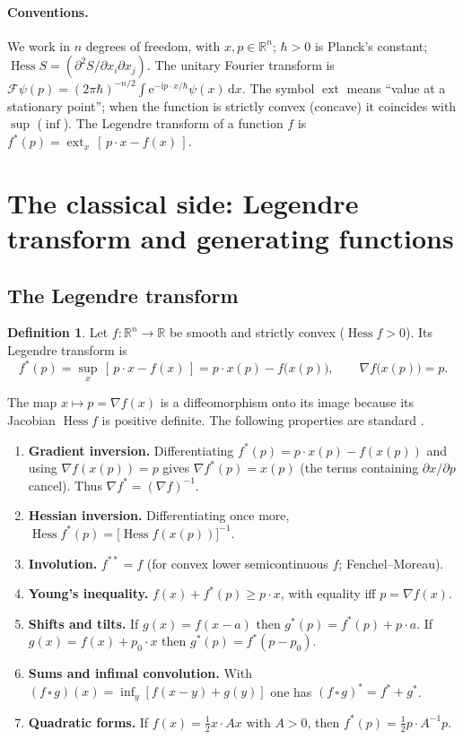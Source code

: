 \documentclass[11pt,a4paper]{article}
\newcommand{\R}{\mathbb{R}}
\newcommand{\ii}{\mathrm{i}}
\newcommand{\dd}{\mathrm{d}}
\newcommand{\ee}{\mathrm{e}}
\newcommand{\hb}{\hbar}
\newcommand{\Hess}{\operatorname{Hess}}
\newcommand{\ext}{\operatorname*{ext}}
\newcommand{\FT}{\mathcal{F}}
\theoremstyle{plain}
\theoremstyle{definition}
\newtheorem{definition}[theorem]{Definition}
\theoremstyle{remark}
\begin{document}
\paragraph{Conventions.}
We work in $n$ degrees of freedom, with $x,p\in\R^n$; $\hb>0$ is Planck's constant; $\Hess S=(\partial^2S/\partial x_i\partial x_j)$. The unitary Fourier transform is $\FT\psi(p)=(2\pi\hb)^{-n/2}\int\ee^{-\ii p\cdot x/\hb}\psi(x)\,\dd x$. The symbol $\ext$ means ``value at a stationary point''; when the function is strictly convex (concave) it coincides with $\sup$ ($\inf$). The Legendre transform of a function $f$ is $f^*(p)=\ext_x\,[\,p\cdot x-f(x)\,]$.

\section{The classical side: Legendre transform and generating functions}

\subsection{The Legendre transform}

\begin{definition}
Let $f:\R^n\to\R$ be smooth and strictly convex ($\Hess f>0$). Its Legendre transform is
\begin{equation}
f^*(p)=\sup_{x}\,[\,p\cdot x-f(x)\,]=p\cdot x(p)-f\bigl(x(p)\bigr),\qquad \nabla f\bigl(x(p)\bigr)=p .
\end{equation}
\end{definition}

The map $x\mapsto p=\nabla f(x)$ is a diffeomorphism onto its image because its Jacobian $\Hess f$ is positive definite. The following properties are standard \cite{Arnold,Rockafellar,Zia}.

\begin{enumerate}[label=(L\arabic*),leftmargin=*]
\item \textbf{Gradient inversion.} Differentiating $f^*(p)=p\cdot x(p)-f(x(p))$ and using $\nabla f(x(p))=p$ gives $\nabla f^*(p)=x(p)$ (the terms containing $\partial x/\partial p$ cancel). Thus $\nabla f^*=(\nabla f)^{-1}$.
\item \textbf{Hessian inversion.} Differentiating once more, $\Hess f^*(p)=\bigl[\Hess f(x(p))\bigr]^{-1}$.
\item \textbf{Involution.} $f^{**}=f$ (for convex lower semicontinuous $f$; Fenchel--Moreau).
\item \textbf{Young's inequality.} $f(x)+f^*(p)\ge p\cdot x$, with equality iff $p=\nabla f(x)$.
\item \textbf{Shifts and tilts.} If $g(x)=f(x-a)$ then $g^*(p)=f^*(p)+p\cdot a$. If $g(x)=f(x)+p_0\cdot x$ then $g^*(p)=f^*(p-p_0)$.
\item \textbf{Sums and infimal convolution.} With $(f\,\square\,g)(x)=\inf_y[f(x-y)+g(y)]$ one has $(f\,\square\,g)^*=f^*+g^*$.
\item \textbf{Quadratic forms.} If $f(x)=\tfrac12 x\cdot Ax$ with $A>0$, then $f^*(p)=\tfrac12 p\cdot A^{-1}p$.
\end{enumerate}
\end{document}

